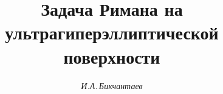 






\renewcommand{\d}{{\mathrm{d}}}


\newcommand{\ord}{\operatorname{ord}}


\newcommand{\tts}[1]{}







\setcounter{page}{19}















\author{\it И.А.\,Бикчантаев}




\title{Задача Римана на ультрагиперэллиптической поверхности}









\date{}




\pagestyle{plain} %







\maketitle


